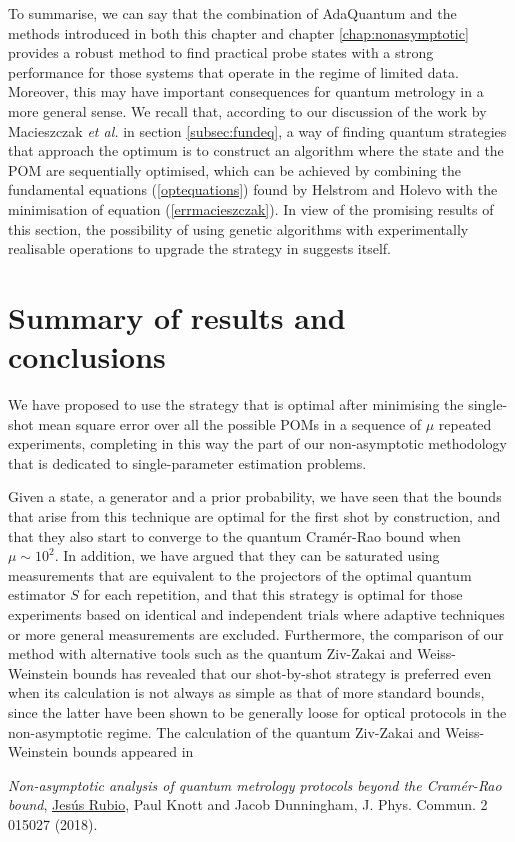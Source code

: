 To summarise, we can say that the combination of AdaQuantum and the methods introduced in both this chapter and chapter \ref{chap:nonasymptotic} provides a robust method to find practical probe states with a strong performance for those systems that operate in the regime of limited data. Moreover, this may have important consequences for quantum metrology in a more general sense. We recall that, according to our discussion of the work by Macieszczak \emph{et al.} \cite{macieszczak2014bayesian} in section \ref{subsec:fundeq}, a way of finding quantum strategies that approach the optimum is to construct an algorithm where the state and the POM are sequentially optimised, which can be achieved by combining the fundamental equations (\ref{optequations}) found by Helstrom and Holevo \cite{helstrom1976, helstrom1974, holevo1973b, holevo1973} with the minimisation of equation (\ref{errmacieszczak}). In view of the promising results of this section, the possibility of using genetic algorithms with experimentally realisable operations to upgrade the strategy in \cite{macieszczak2014bayesian} suggests itself.

\section{Summary of results and conclusions}

We have proposed to use the strategy that is optimal after minimising the single-shot mean square error over all the possible POMs in a sequence of $\mu$ repeated experiments, completing in this way the part of our non-asymptotic methodology that is dedicated to single-parameter estimation problems. 

Given a state, a generator and a prior probability, we have seen that the bounds that arise from this technique are optimal for the first shot by construction, and that they also start to converge to the quantum Cram\'{e}r-Rao bound when $\mu\sim 10^2$. In addition, we have argued that they can be saturated using measurements that are equivalent to the projectors of the optimal quantum estimator $S$ for each repetition, and that this strategy is optimal for those experiments based on identical and independent trials where adaptive techniques or more general measurements are excluded. Furthermore, the comparison of our method with alternative tools such as the quantum Ziv-Zakai and Weiss-Weinstein bounds has revealed that our shot-by-shot strategy is preferred even when its calculation is not always as simple as that of more standard bounds, since the latter have been shown to be generally loose for optical protocols in the non-asymptotic regime. The calculation of the quantum Ziv-Zakai and Weiss-Weinstein bounds appeared in 
\cite{jesus2017}
\begin{displayquote}
\emph{Non-asymptotic analysis of quantum metrology protocols beyond the Cram\'{e}r-Rao bound}, \underline{Jes\'{u}s Rubio}, Paul Knott and Jacob Dunningham, J. Phys. Commun. 2 015027 (2018).
\end{displayquote}

